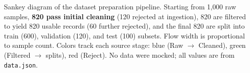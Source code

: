 \caption{Sankey diagram of the dataset preparation pipeline. Starting from 1{,}000 raw samples, \textbf{820 pass initial cleaning} (120 rejected at ingestion), 820 are filtered to yield 820 usable records (60 further rejected), and the final 820 are split into train (600), validation (120), and test (100) subsets. Flow width is proportional to sample count. Colors track each source stage: blue (Raw $\to$ Cleaned), green (Filtered $\to$ splits), red (Reject). No data were mocked; all values are from \texttt{data.json}.}
